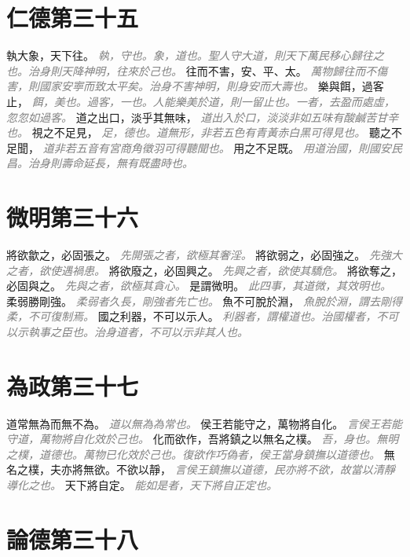 \documentclass[a4paper,zihao=-4,oneside,landscape,UTF8]{ctexart}
\newcommand{\zhushi}[1]{\scriptsize{\textit{\textcolor{gray}{#1}}}\normalsize}
\begin{document}
\section{仁德第三十五}

執大象，天下往。
\zhushi{執，守也。象，道也。聖人守大道，則天下萬民移心歸往之也。治身則天降神明，往來於己也。}
往而不害，安、平、太。
\zhushi{萬物歸往而不傷害，則國家安寕而致太平矣。治身不害神明，則身安而大壽也。}
樂與餌，過客止，
\zhushi{餌，美也。過客，一也。人能樂美於道，則一留止也。一者，去盈而處虛，忽忽如過客。}
道之出口，淡乎其無味，
\zhushi{道出入於口，淡淡非如五味有酸鹹苦甘辛也。}
視之不足見，
\zhushi{足，德也。道無形，非若五色有青黃赤白黑可得見也。}
聽之不足聞，
\zhushi{道非若五音有宮商角徵羽可得聽聞也。}
用之不足既。
\zhushi{用道治國，則國安民昌。治身則壽命延長，無有既盡時也。}


\section{微明第三十六}

將欲歙之，必固張之。
\zhushi{先開張之者，欲極其奢淫。}
將欲弱之，必固強之。
\zhushi{先強大之者，欲使遇禍患。}
將欲廢之，必固興之。
\zhushi{先興之者，欲使其驕危。}
將欲奪之，必固與之。
\zhushi{先與之者，欲極其貪心。}
是謂微明。
\zhushi{此四事，其道微，其效明也。}
柔弱勝剛強。
\zhushi{柔弱者久長，剛強者先亡也。}
魚不可脫於淵，
\zhushi{魚脫於淵，謂去剛得柔，不可復制焉。}
國之利器，不可以示人。
\zhushi{利器者，謂權道也。治國權者，不可以示執事之臣也。治身道者，不可以示非其人也。}


\section{為政第三十七}

道常無為而無不為。
\zhushi{道以無為為常也。}
侯王若能守之，萬物將自化。
\zhushi{言侯王若能守道，萬物將自化效於己也。}
化而欲作，吾將鎮之以無名之樸。
\zhushi{吾，身也。無明之樸，道德也。萬物已化效於己也。復欲作巧偽者，侯王當身鎮撫以道德也。}
無名之樸，夫亦將無欲。不欲以靜，
\zhushi{言侯王鎮撫以道德，民亦將不欲，故當以清靜導化之也。}
天下將自定。
\zhushi{能如是者，天下將自正定也。}


\section{論德第三十八}
\end{document}
